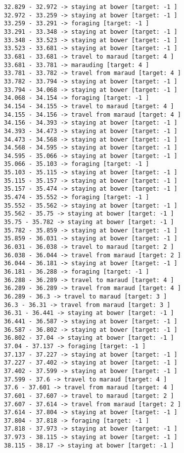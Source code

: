 \documentclass[11pt]{article}
\begin{document}
\begin{Verbatim}[commandchars=\\\{\}]
32.829 - 32.972 -> staying at bower [target: -1 ]
32.972 - 33.259 -> staying at bower [target: -1 ]
33.259 - 33.291 -> foraging [target: -1 ]
33.291 - 33.348 -> staying at bower [target: -1 ]
33.348 - 33.523 -> staying at bower [target: -1 ]
33.523 - 33.681 -> staying at bower [target: -1 ]
33.681 - 33.681 -> travel to maraud [target: 4 ]
33.681 - 33.781 -> marauding [target: 4 ]
33.781 - 33.782 -> travel from maraud [target: 4 ]
33.782 - 33.794 -> staying at bower [target: -1 ]
33.794 - 34.068 -> staying at bower [target: -1 ]
34.068 - 34.154 -> foraging [target: -1 ]
34.154 - 34.155 -> travel to maraud [target: 4 ]
34.155 - 34.156 -> travel from maraud [target: 4 ]
34.156 - 34.393 -> staying at bower [target: -1 ]
34.393 - 34.473 -> staying at bower [target: -1 ]
34.473 - 34.568 -> staying at bower [target: -1 ]
34.568 - 34.595 -> staying at bower [target: -1 ]
34.595 - 35.066 -> staying at bower [target: -1 ]
35.066 - 35.103 -> foraging [target: -1 ]
35.103 - 35.115 -> staying at bower [target: -1 ]
35.115 - 35.157 -> staying at bower [target: -1 ]
35.157 - 35.474 -> staying at bower [target: -1 ]
35.474 - 35.552 -> foraging [target: -1 ]
35.552 - 35.562 -> staying at bower [target: -1 ]
35.562 - 35.75 -> staying at bower [target: -1 ]
35.75 - 35.782 -> staying at bower [target: -1 ]
35.782 - 35.859 -> staying at bower [target: -1 ]
35.859 - 36.031 -> staying at bower [target: -1 ]
36.031 - 36.038 -> travel to maraud [target: 2 ]
36.038 - 36.044 -> travel from maraud [target: 2 ]
36.044 - 36.181 -> staying at bower [target: -1 ]
36.181 - 36.288 -> foraging [target: -1 ]
36.288 - 36.289 -> travel to maraud [target: 4 ]
36.289 - 36.289 -> travel from maraud [target: 4 ]
36.289 - 36.3 -> travel to maraud [target: 3 ]
36.3 - 36.31 -> travel from maraud [target: 3 ]
36.31 - 36.441 -> staying at bower [target: -1 ]
36.441 - 36.587 -> staying at bower [target: -1 ]
36.587 - 36.802 -> staying at bower [target: -1 ]
36.802 - 37.04 -> staying at bower [target: -1 ]
37.04 - 37.137 -> foraging [target: -1 ]
37.137 - 37.227 -> staying at bower [target: -1 ]
37.227 - 37.402 -> staying at bower [target: -1 ]
37.402 - 37.599 -> staying at bower [target: -1 ]
37.599 - 37.6 -> travel to maraud [target: 4 ]
37.6 - 37.601 -> travel from maraud [target: 4 ]
37.601 - 37.607 -> travel to maraud [target: 2 ]
37.607 - 37.614 -> travel from maraud [target: 2 ]
37.614 - 37.804 -> staying at bower [target: -1 ]
37.804 - 37.818 -> foraging [target: -1 ]
37.818 - 37.973 -> staying at bower [target: -1 ]
37.973 - 38.115 -> staying at bower [target: -1 ]
38.115 - 38.17 -> staying at bower [target: -1 ]

\end{Verbatim}
\end{document}
